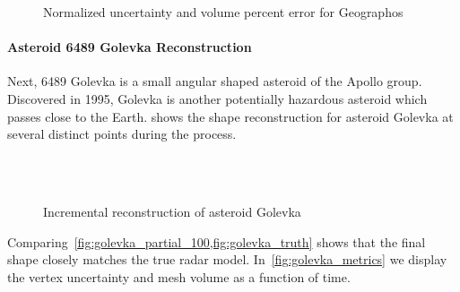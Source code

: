 \documentclass[smallextended]{svjour3}       %
\begin{document}
\begin{figure}[htbp]
    \centering
    
    \caption{Normalized uncertainty and volume percent error for Geographos\label{fig:geographos_metrics}}
\end{figure}

\paragraph{Asteroid \num{6489} Golevka Reconstruction} 
Next, \num{6489} Golevka is a small angular shaped asteroid of the Apollo group.
Discovered in \num{1995}, Golevka is another potentially hazardous asteroid which passes close to the Earth.
 shows the shape reconstruction for asteroid Golevka at several distinct points during the process.
\begin{figure}[htbp]
    \centering
    \\%

    \\%

    \caption[Asteroid Golevka incremental reconstruction]{Incremental reconstruction of asteroid Golevka~\label{fig:golevka_reconstruction}}
\end{figure}
Comparing~\cref{fig:golevka_partial_100,fig:golevka_truth} shows that the final shape closely matches the true radar model.
In~\cref{fig:golevka_metrics} we display the vertex uncertainty and mesh volume as a function of time.
\end{document}
